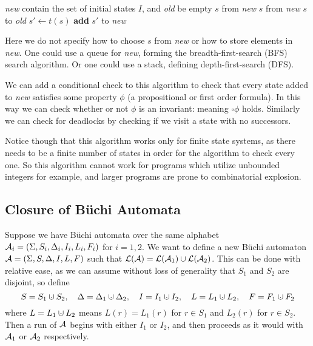 \algorithm
     {\it new} contain the set of initial states $I$, and {\it old} be empty
         $s$ from {\it new}
         $s$ from {\it new}
         $s$ to {\it old}
            \State $s'\gets t(s)$
             {\bf add} $s'$ to {\it new}
        \EndFor
    \EndWhile
\ealgorithm

Here we do not specify how to choose $s$ from {\it new} or how to store elements in {\it new}.
One could use a queue for {\it new}, forming the breadth-first-search (BFS) search algorithm.
Or one could use a stack, defining depth-first-search (DFS).

We can add a conditional check to this algorithm to check that every state added to {\it new} satisfies some property $\phi$ (a propositional or first order formula).
In this way we can check whether or not $\phi$ is an invariant: meaning $\square\phi$ holds.
Similarly we can check for deadlocks by checking if we visit a state with no successors.

Notice though that this algorithm works only for finite state systems, as there needs to be a finite number of states in order for the algorithm to check every one.
So this algorithm cannot work for programs which utilize unbounded integers for example, and larger programs are prone to combinatorial explosion.

\subsection{Closure of B\"uchi Automata}

Suppose we have B\"uchi automata over the same alphabet ${\cal A}_i=(\Sigma,S_i,\Delta_i,I_i,L_i,F_i)$ for $i=1,2$.
We want to define a new B\"uchi automaton ${\cal A}=(\Sigma,S,\Delta,I,L,F)$ such that ${\cal L}({\cal A})={\cal L}({\cal A}_1)\cup{\cal L}({\cal A}_2)$.
This can be done with relative ease, as we can assume without loss of generality that $S_1$ and $S_2$ are disjoint, so define
$$ S = S_1\dcup S_2,\quad \Delta=\Delta_1\dcup\Delta_2,\quad I=I_1\dcup I_2,\quad L=L_1\dcup L_2,\quad F=F_1\dcup F_2 $$
where $L=L_1\dcup L_2$ means $L(r)=L_1(r)$ for $r\in S_1$ and $L_2(r)$ for $r\in S_2$.
Then a run of ${\cal A}$ begins with either $I_1$ or $I_2$, and then proceeds as it would with ${\cal A}_1$ or ${\cal A}_2$ respectively.


